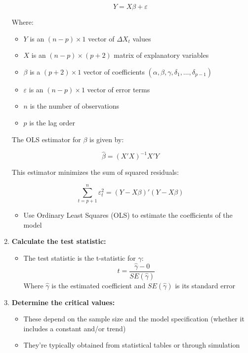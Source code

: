 \documentclass{article}
\begin{document}
\begin{definition}
\begin{enumerate}
      \begin{equation}
      Y = X\beta + \varepsilon
      \end{equation}

      Where:
      \begin{itemize}
          \item $Y$ is an $(n-p) \times 1$ vector of $\Delta X_t$ values
          \item $X$ is an $(n-p) \times (p+2)$ matrix of explanatory variables
          \item $\beta$ is a $(p+2) \times 1$ vector of coefficients $(\alpha, \beta, \gamma, \delta_1, \ldots, \delta_{p-1})$
          \item $\varepsilon$ is an $(n-p) \times 1$ vector of error terms
          \item $n$ is the number of observations
          \item $p$ is the lag order
      \end{itemize}

      The OLS estimator for $\beta$ is given by:

      \begin{equation}
      \hat{\beta} = (X'X)^{-1}X'Y
      \end{equation}

      This estimator minimizes the sum of squared residuals:

      \begin{equation}
      \sum_{t=p+1}^n \varepsilon_t^2 = (Y - X\beta)'(Y - X\beta)
      \end{equation}
      \begin{itemize}
          \item Use Ordinary Least Squares (OLS) to estimate the coefficients of the model
      \end{itemize}

      \item \textbf{Calculate the test statistic:}
      \begin{itemize}
          \item The test statistic is the t-statistic for $\gamma$:
          \begin{equation}
          t = \frac{\hat{\gamma} - 0}{SE(\hat{\gamma})}
          \end{equation}
          Where $\hat{\gamma}$ is the estimated coefficient and $SE(\hat{\gamma})$ is its standard error
      \end{itemize}

      \item \textbf{Determine the critical values:}
      \begin{itemize}
          \item These depend on the sample size and the model specification (whether it includes a constant and/or trend)
          \item They're typically obtained from statistical tables or through simulation
      \end{itemize}


\end{enumerate}
\end{definition}
\end{document}
